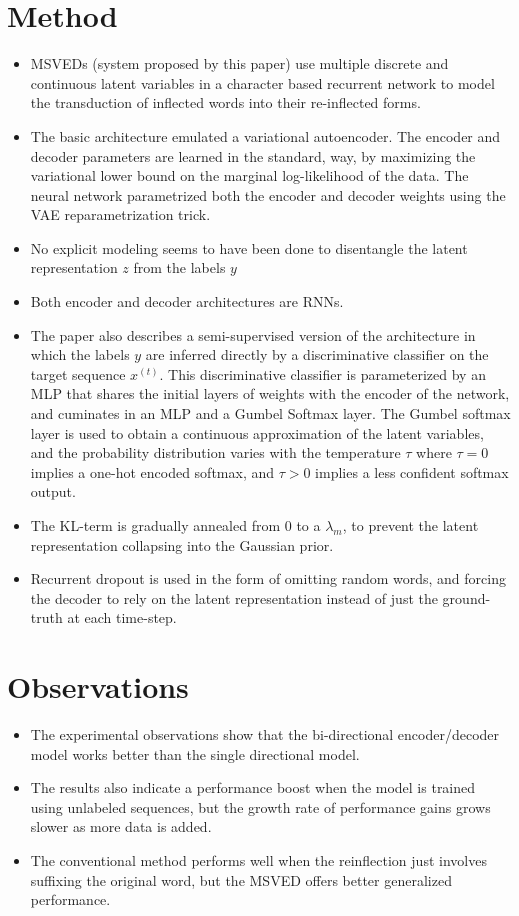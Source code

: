 \documentclass[12pt]{scrartcl}
\begin{document}
\section{Method}
  \begin{itemize}
    \item MSVEDs (system proposed by this paper) use multiple discrete and continuous latent variables in a character based recurrent network to model the transduction of inflected words into their re-inflected forms.
    \item The basic architecture emulated a variational autoencoder. The encoder and decoder parameters are learned in the standard, way, by maximizing the variational lower bound on the marginal log-likelihood of the data. The neural network parametrized both the encoder and decoder weights using the VAE reparametrization trick.
    \item No explicit modeling seems to have been done to disentangle the latent representation $z$ from the labels $y$
    \item Both encoder and decoder architectures are RNNs.
    \item The paper also describes a semi-supervised version of the architecture in which the labels $y$ are inferred directly by a discriminative classifier on the target sequence $x^{(t)}$. This discriminative classifier is parameterized by an MLP that shares the initial layers of weights with the encoder of the network, and cuminates in an MLP and a Gumbel Softmax layer. The Gumbel softmax layer is used to obtain a continuous approximation of the latent variables, and the probability distribution varies with the temperature $\tau$ where $\tau = 0$ implies a one-hot encoded softmax, and $\tau > 0$ implies a less confident softmax output.
    \item The KL-term is gradually annealed from 0 to a $\lambda_m$, to prevent the latent representation collapsing into the Gaussian prior.
    \item Recurrent dropout is used in the form of omitting random words, and forcing the decoder to rely on the latent representation instead of just the ground-truth at each time-step.
  \end{itemize}

\section{Observations}
  \begin{itemize}
    \item The experimental observations show that the bi-directional encoder/decoder model works better than the single directional model.
    \item The results also indicate a performance boost when the model is trained using unlabeled sequences, but the growth rate of performance gains grows slower as more data is added.
    \item The conventional method performs well when the reinflection just involves suffixing the original word, but the MSVED offers better generalized performance.
  \end{itemize}



\end{document}
